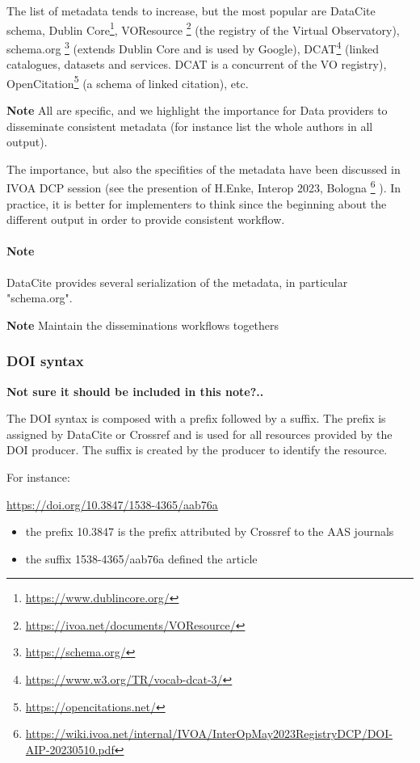 \documentclass[11pt,a4paper]{ivoa}
\newcommand{\important}[1]{
	\begin{bigdescription}
		\item \color{ivoacolor}\textbf{Note} #1
	\end{bigdescription}
}
\begin{document}
The list of metadata tends to increase, but the most popular are DataCite schema, Dublin Core\footnote{\url{https://www.dublincore.org/}}, VOResource \footnote{\url{https://ivoa.net/documents/VOResource/}} (the registry of the Virtual Observatory), schema.org \footnote{\url{https://schema.org/}} (extends Dublin Core and is used by Google), DCAT\footnote{\url{https://www.w3.org/TR/vocab-dcat-3/}} (linked catalogues, datasets and services. DCAT is a concurrent of the VO registry), OpenCitation\footnote{\url{https://opencitations.net/}} (a schema of linked citation),  etc.

\important{
All are specific, and we highlight the importance for Data providers to disseminate consistent metadata
(for instance list the whole authors in all output).
}

The importance, but also the specifities of the metadata have been discussed in IVOA DCP session (see the presention of H.Enke, Interop 2023, Bologna \footnote{\url{https://wiki.ivoa.net/internal/IVOA/InterOpMay2023RegistryDCP/DOI-AIP-20230510.pdf}}
). In practice, it is better for implementers to think since the beginning about the different output in order to provide consistent workflow.

\paragraph{Note} DataCite provides several serialization of the metadata, in particular "schema.org".

\important{
Maintain the disseminations workflows togethers
}


\subsubsection{DOI syntax}
\textbf{\color{red} Not sure it should be included in this note?..}

The DOI syntax is composed with a prefix followed by a suffix.
The prefix is assigned by DataCite or Crossref and is used for all resources provided by the DOI producer. The suffix is created by the producer to identify the resource.

For instance: 

\url{https://doi.org/10.3847/1538-4365/aab76a}

\begin{itemize}
	\item the prefix 10.3847 is the prefix attributed by Crossref to the AAS journals 
	\item the suffix 1538-4365/aab76a defined the article 
\end{itemize}
\end{document}

